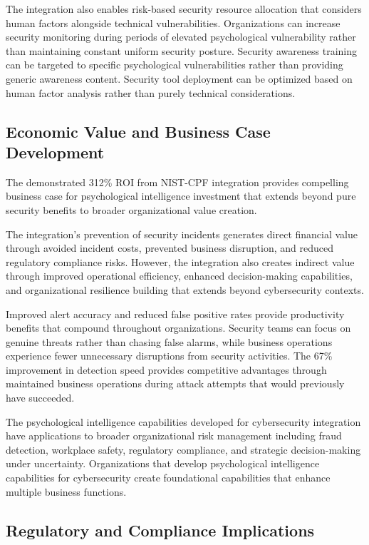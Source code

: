\documentclass[10pt, twocolumn]{article}
\begin{document}
The integration also enables risk-based security resource allocation that considers human factors alongside technical vulnerabilities. Organizations can increase security monitoring during periods of elevated psychological vulnerability rather than maintaining constant uniform security posture. Security awareness training can be targeted to specific psychological vulnerabilities rather than providing generic awareness content. Security tool deployment can be optimized based on human factor analysis rather than purely technical considerations.

\subsection{Economic Value and Business Case Development}

The demonstrated 312\% ROI from NIST-CPF integration provides compelling business case for psychological intelligence investment that extends beyond pure security benefits to broader organizational value creation.

The integration's prevention of security incidents generates direct financial value through avoided incident costs, prevented business disruption, and reduced regulatory compliance risks. However, the integration also creates indirect value through improved operational efficiency, enhanced decision-making capabilities, and organizational resilience building that extends beyond cybersecurity contexts.

Improved alert accuracy and reduced false positive rates provide productivity benefits that compound throughout organizations. Security teams can focus on genuine threats rather than chasing false alarms, while business operations experience fewer unnecessary disruptions from security activities. The 67\% improvement in detection speed provides competitive advantages through maintained business operations during attack attempts that would previously have succeeded.

The psychological intelligence capabilities developed for cybersecurity integration have applications to broader organizational risk management including fraud detection, workplace safety, regulatory compliance, and strategic decision-making under uncertainty. Organizations that develop psychological intelligence capabilities for cybersecurity create foundational capabilities that enhance multiple business functions.

\subsection{Regulatory and Compliance Implications}
\end{document}
